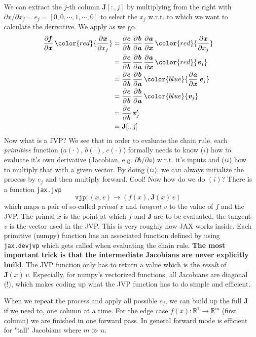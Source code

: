 \documentclass[paper=a4,11pt,headsepline]{scrartcl}
\newcommand{\ve}[1]{\ensuremath{\bm{\mathit{#1}}}}
\newcommand{\ma}[1]{\ensuremath{\bm{\mathbf{#1}}}}
\newcommand{\ra}{\ensuremath{\rightarrow}}
\newcommand{\pd}[2]{\dfrac{\partial #1}{\partial #2}}
\newcommand{\pdi}[2]{\partial #1/\partial #2}
\newcommand{\red}[1]{{\color{red}{#1}}}
\newcommand{\blue}[1]{{\color{blue}{#1}}}
\begin{document}
We can extract the $j$-th column $\ma J[:,j]$ by multiplying from the right
with $\partial\ve x/\partial x_j = \ve e_j = [0,0,\cdots,1,\cdots, 0]$ to
select the $x_j$ w.r.t. to which we want to calculate the derivative. We apply
\blue{Jacobian vector products (JVPs)} as we go.
\begin{align*}
    \pd{\ve f}{\ve x}\,\red{\pd{\ve x}{x_j}}
        &= \pd{\ve c}{\ve b}\,\pd{\ve b}{\ve a}\,\pd{\ve a}{\ve x}\,\red{\pd{\ve x}{x_j}}\\
        &= \pd{\ve c}{\ve b}\,\pd{\ve b}{\ve a}\,\pd{\ve a}{\ve x}\,\red{\ve e_j}\\
        &= \pd{\ve c}{\ve b}\,\pd{\ve b}{\ve a}\,\blue{\pd{\ve a}{\ve x}\,\ve e_j} \\
        &= \pd{\ve c}{\ve b}\,\pd{\ve b}{\ve a}\,\blue{\ve v_j} \\
        &= \pd{\ve c}{\ve b}\,\ve v_j' \\
        &= \ma J[:,j]
\end{align*}
Now what is a JVP? We see that in order to evaluate the chain rule,
each \emph{primitive} function ($\ve a(\cdot)$, $\ve b(\cdot)$, $\ve c(\cdot)$)
formally needs to know ($i$) how to evaluate it's own derivative (Jacobian, e.g.
$\pdi{\ve b}{\ve a}$) w.r.t. it's inputs and ($ii$) how to multiply that with a given vector.
By doing ($ii$), we can always initialize the process by $\ve e_j$ and then
multiply forward. Cool! Now how do we do $(i)$? There is a function \texttt{jax.jvp}
\begin{equation*}
    \texttt{vjp}: (\ve x, \ve v) \ra \left(\ve f(\ve x), \ma J(\ve x)\,\ve v\right)
\end{equation*}
which maps a pair of so-called \emph{primal} \ve x and \emph{tangent} \ve v to the value
of \ve f and the JVP. The primal \ve x is the point at which \ve f and \ma J are
to be evaluated, the tangent \ve v is the vector used in the JVP. This is very
roughly how JAX works inside. Each primitive (numpy) function has an associated
function defined by using \texttt{jax.devjvp} which gets called when evaluating
the chain rule. \textbf{The most important trick is that the intermediate Jacobians are
never explicitly build}. The JVP function only has to return a value
which is the \emph{result} of $\ma J(\ve x)\,\ve v$. Especially, for numpy's
vectorized functions, all Jacobians are diagonal (!), which makes coding up what
the JVP function has to do simple and efficient.

When we repeat the process and apply all possible $\ve e_j$, we can build up the
full $\ma J$ if we need to, one column at a time. For the edge case $\ve f(x): \mathbb R^1
\ra \mathbb R^m$ (first column) we are finished in one forward pass. In general
forward mode is efficient for "tall" Jacobians where $m\gg n$.
\end{document}
